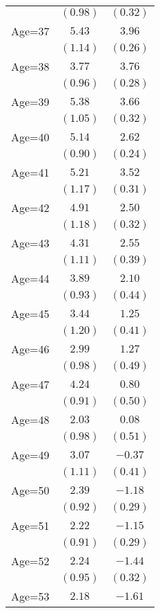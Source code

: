\documentclass[fullpage]{paper}
\begin{document}
\begin{center}
\begin{longtable}{l c c }
            & $(0.98)$ & $(0.32)$ \\
Age=37      & $5.43$   & $3.96$   \\
            & $(1.14)$ & $(0.26)$ \\
Age=38      & $3.77$   & $3.76$   \\
            & $(0.96)$ & $(0.28)$ \\
Age=39      & $5.38$   & $3.66$   \\
            & $(1.05)$ & $(0.32)$ \\
Age=40      & $5.14$   & $2.62$   \\
            & $(0.90)$ & $(0.24)$ \\
Age=41      & $5.21$   & $3.52$   \\
            & $(1.17)$ & $(0.31)$ \\
Age=42      & $4.91$   & $2.50$   \\
            & $(1.18)$ & $(0.32)$ \\
Age=43      & $4.31$   & $2.55$   \\
            & $(1.11)$ & $(0.39)$ \\
Age=44      & $3.89$   & $2.10$   \\
            & $(0.93)$ & $(0.44)$ \\
Age=45      & $3.44$   & $1.25$   \\
            & $(1.20)$ & $(0.41)$ \\
Age=46      & $2.99$   & $1.27$   \\
            & $(0.98)$ & $(0.49)$ \\
Age=47      & $4.24$   & $0.80$   \\
            & $(0.91)$ & $(0.50)$ \\
Age=48      & $2.03$   & $0.08$   \\
            & $(0.98)$ & $(0.51)$ \\
Age=49      & $3.07$   & $-0.37$  \\
            & $(1.11)$ & $(0.41)$ \\
Age=50      & $2.39$   & $-1.18$  \\
            & $(0.92)$ & $(0.29)$ \\
Age=51      & $2.22$   & $-1.15$  \\
            & $(0.91)$ & $(0.29)$ \\
Age=52      & $2.24$   & $-1.44$  \\
            & $(0.95)$ & $(0.32)$ \\
Age=53      & $2.18$   & $-1.61$  \\

\end{longtable}
\end{center}
\end{document}
